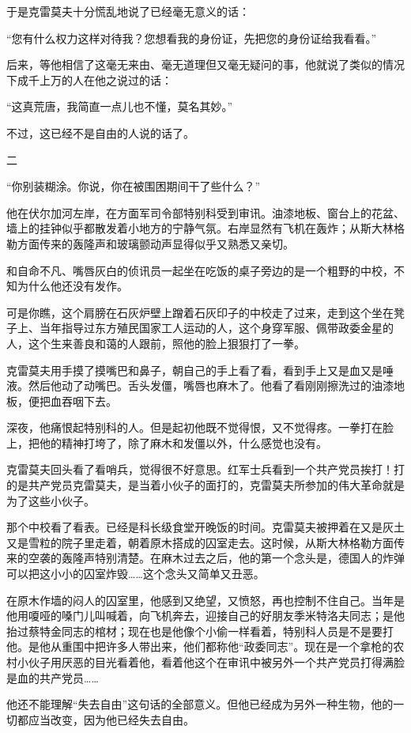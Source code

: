 于是克雷莫夫十分慌乱地说了已经毫无意义的话：

“您有什么权力这样对待我？您想看我的身份证，先把您的身份证给我看看。”

后来，等他相信了这毫无来由、毫无道理但又毫无疑问的事，他就说了类似的情况下成千上万的人在他之说过的话：

“这真荒唐，我简直一点儿也不懂，莫名其妙。”

不过，这已经不是自由的人说的话了。

二

“你别装糊涂。你说，你在被围困期间干了些什么？”

他在伏尔加河左岸，在方面军司令部特别科受到审讯。油漆地板、窗台上的花盆、墙上的挂钟似乎都散发着小地方的宁静气氛。右岸显然有飞机在轰炸；从斯大林格勒方面传来的轰隆声和玻璃颤动声显得似乎又熟悉又亲切。

和自命不凡、嘴唇灰白的侦讯员一起坐在吃饭的桌子旁边的是一个粗野的中校，不知为什么他还没有发作。

可是你瞧，这个肩膀在石灰炉壁上蹭着石灰印子的中校走了过来，走到这个坐在凳子上、当年指导过东方殖民国家工人运动的人，这个身穿军服、佩带政委金星的人，这个生来善良和蔼的人跟前，照他的脸上狠狠打了一拳。

克雷莫夫用手摸了摸嘴巴和鼻子，朝自己的手上看了看，看到手上又是血又是唾液。然后他动了动嘴巴。舌头发僵，嘴唇也麻木了。他看了看刚刚擦洗过的油漆地板，便把血吞咽下去。

深夜，他痛恨起特别科的人。但是起初他既不觉得恨，又不觉得疼。一拳打在脸上，把他的精神打垮了，除了麻木和发僵以外，什么感觉也没有。

克雷莫夫回头看了看哨兵，觉得很不好意思。红军士兵看到一个共产党员挨打！打的是共产党员克雷莫夫，是当着小伙子的面打的，克雷莫夫所参加的伟大革命就是为了这些小伙子。

那个中校看了看表。已经是科长级食堂开晚饭的时间。克雷莫夫被押着在又是灰土又是雪粒的院子里走着，朝着原木搭成的囚室走去。这时候，从斯大林格勒方面传来的空袭的轰隆声特别清楚。在麻木过去之后，他的第一个念头是，德国人的炸弹可以把这小小的囚室炸毁……这个念头又简单又丑恶。

在原木作墙的闷人的囚室里，他感到又绝望，又愤怒，再也控制不住自己。当年是他用嗄哑的嗓门儿叫喊着，向飞机奔去，迎接自己的好朋友季米特洛夫同志；是他抬过蔡特金同志的棺材；现在也是他像个小偷一样看着，特别科人员是不是要打他。是他从重围中把许多人带出来，他们都称他“政委同志”。现在是一个拿枪的农村小伙子用厌恶的目光看着他，看着他这个在审讯中被另外一个共产党员打得满脸是血的共产党员……

他还不能理解“失去自由”这句话的全部意义。但他已经成为另外一种生物，他的一切都应当改变，因为他已经失去自由。


